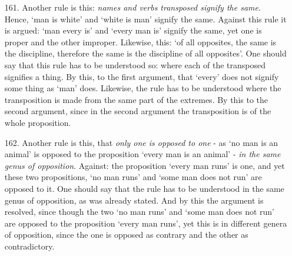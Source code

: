 \begin{itemize}
On account of this, one should know that a proposition is called `per se' in three ways: in one way when the predicate falls in the definition of the subject, as `man is an animal'; in a second way, when the subject falls in the definition of the predicate, and in this way `man is risible' is true;\footnote{true] \textit{per se} L, \textit{def.} CO} in a third way, when the subject is the efficient cause of the predicate, as `a killer kills',\footnote{a killer kills] the killed is killed L, \textit{def.} CO}, from killing.

To the reasons: to the first I say that a surface is not \textit{per se} white, taking \textit{per se} as it is taken in the book of the \textit{Posterior [Analytics]}; yet this can indeed be \textit{per se}, because immediate. To the other I say that `man is mortal' is not \textit{per se}, since `mortal' is a passion resulting in a defect, and such is not predicated \textit{per se} of the species, nor of the individual.
\item[161.] Another rule is this: \textit{names and verbs transposed signify the same}. Hence, `man is white' and `white is man' signify the same. Against this rule it is argued: `man every is' and `every man is' signify the same, yet one is proper and the other improper. Likewise, this: `of all opposites, the same is the discipline, therefore the same is the discipline of all opposites'. One should say that this rule has to be understood so: where each of the transposed signifies a thing. By this, to the first argument, that `every' does not signify some thing as `man' does. Likewise, the rule has to be understood where the transposition is made from the same part of the extremes. By this to the second argument, since in the second argument the transposition is of the whole proposition.
\item[162.] Another rule is this, that \textit{only one is opposed to one} - as `no man is an animal' is opposed to the proposition `every man is an animal' - \textit{in the same genus of opposition}. Against: the proposition `every man runs' is one, and yet these two propositions, `no man runs' and `some man does not run' are opposed to it. One should say that the rule has to be understood in the same genus of opposition, as was already stated. And by this the argument is resolved, since though the two `no man runs' and `some man does not run' are opposed to the proposition `every man runs', yet this is in different genera of opposition, since the one is opposed as contrary and the other as contradictory.

\end{itemize}

